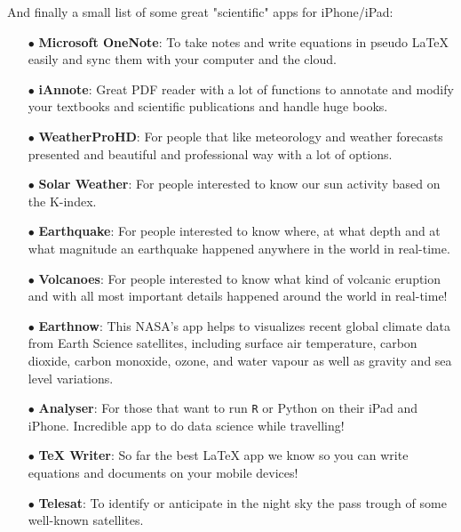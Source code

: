 	\pagebreak
	And finally a small list of some great "scientific" apps for iPhone/iPad:
	\begin{itemize}
		\item[$\bullet$] \textbf{Microsoft OneNote}: To take notes and write equations in pseudo LaTeX easily and sync them with your computer and the cloud.
		
		\item[$\bullet$] \textbf{iAnnote}: Great PDF reader with a lot of functions to annotate and modify your textbooks and scientific publications and handle huge books.
		
		\item[$\bullet$] \textbf{WeatherProHD}: For people that like meteorology and weather forecasts presented and beautiful and professional way with a lot of options.
		
		\item[$\bullet$] \textbf{Solar Weather}: For people interested to know our sun activity based on the K-index.
		
		\item[$\bullet$] \textbf{Earthquake}: For people interested to know where, at what depth and at what magnitude an earthquake happened anywhere in the world in real-time.
		
		\item[$\bullet$] \textbf{Volcanoes}: For people interested to know what kind of volcanic eruption and with all most important details happened around the world in real-time!
		
		\item[$\bullet$] \textbf{Earthnow}: This NASA's app helps to visualizes recent global climate data from Earth Science satellites, including surface air temperature, carbon dioxide, carbon monoxide, ozone, and water vapour as well as gravity and sea level variations.
		
		\item[$\bullet$] \textbf{Analyser}: For those that want to run \texttt{R} or Python on their iPad and iPhone. Incredible app to do data science while travelling!
		
		\item[$\bullet$] \textbf{TeX Writer}: So far the best \LaTeX{} app we know so you can write equations and documents on your mobile devices!
		
		\item[$\bullet$] \textbf{Telesat}: To identify or anticipate in the night sky the pass trough of some well-known satellites.
		

\end{itemize}
